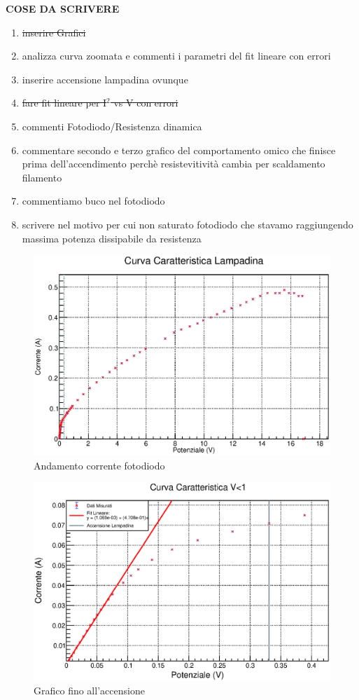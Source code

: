 \documentclass[a4paper]{article}
\begin{document}
\textbf{\huge{COSE DA SCRIVERE}}
\begin{enumerate}
   \item \st{inserire Grafici}
   \item analizza curva zoomata e commenti i parametri del fit lineare con errori 
   \item inserire accensione lampadina ovunque
   \item \st{fare fit lineare per I$^2$ vs V con errori}
   \item commenti Fotodiodo/Resistenza dinamica
   \item commentare secondo e terzo grafico del comportamento omico che finisce prima dell'accendimento perchè resistevitività cambia per scaldamento filamento
   \item commentiamo buco nel fotodiodo
   \item scrivere nel motivo per cui non saturato fotodiodo che stavamo raggiungendo massima potenza dissipabile da resistenza
\end{enumerate}

\begin{figure}[!htbp]
      \includegraphics[width=\textwidth]{immagini/bruciarelampa.eps}
        \caption{Andamento corrente fotodiodo}
\end{figure}
\FloatBarrier

\begin{figure}[!htbp]\label{accensione}
      \includegraphics[width=\textwidth]{immagini/graficozoomato1.eps}
        \caption{Grafico fino all'accensione}
\end{figure}
\FloatBarrier
\end{document}

